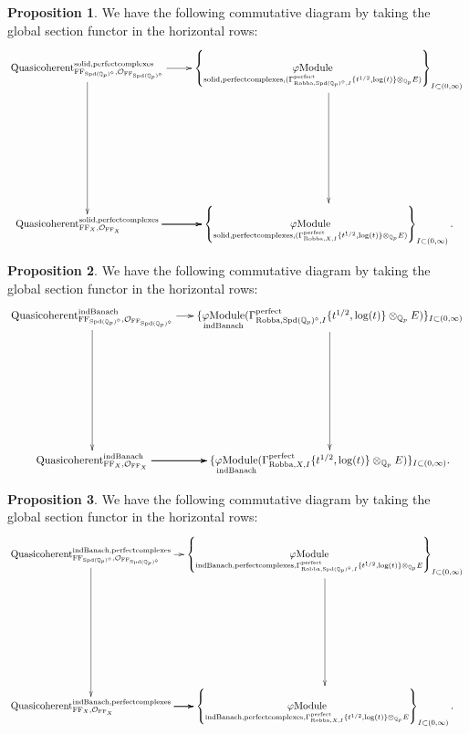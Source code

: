 \documentclass[12pt]{book}
\theoremstyle{definition}
\newtheorem{proposition}{Proposition}
\begin{document}
\begin{proposition}
We have the following commutative diagram by taking the global section functor in the horizontal rows:
\[\displayindent=+0in
\xymatrix@R+7pc{
\mathrm{Quasicoherent}^{\mathrm{solid,perfectcomplexes}}_{\mathrm{FF}_{\mathrm{Spd}(\mathbb{Q}_p)^\diamond},\mathcal{O}_{\mathrm{FF}_{\mathrm{Spd}(\mathbb{Q}_p)^\diamond}}} \ar[r] \ar[d] &\left\{\underset{\mathrm{solid,perfectcomplexes},(\Gamma^\text{perfect}_{\text{Robba},\mathrm{Spd}(\mathbb{Q}_p)^\diamond,I}\{t^{1/2},\log(t)\}\otimes_{\mathbb{Q}_p}E)}{\varphi\mathrm{Module}}\right\}_{I\subset (0,\infty)} \ar[d]  \\
\mathrm{Quasicoherent}^{\mathrm{solid,perfectcomplexes}}_{\mathrm{FF}_X,\mathcal{O}_{\mathrm{FF}_X}}  \ar[r] \ar[r] \ar[r] &\left\{\underset{\mathrm{solid,perfectcomplexes},(\Gamma^\text{perfect}_{\text{Robba},X,I}\{t^{1/2},\log(t)\}\otimes_{\mathbb{Q}_p}E)}{\varphi\mathrm{Module}}\right\}_{I\subset (0,\infty)}.   
}
\]
\end{proposition}

\begin{proposition}
We have the following commutative diagram by taking the global section functor in the horizontal rows:
\[\displayindent=+0in
\xymatrix@C-0.12in@R+7pc{
\mathrm{Quasicoherent}^{\mathrm{indBanach}}_{\mathrm{FF}_{\mathrm{Spd}(\mathbb{Q}_p)^\diamond},\mathcal{O}_{\mathrm{FF}_{\mathrm{Spd}(\mathbb{Q}_p)^\diamond}}} \ar[r] \ar[d] &\{\underset{\mathrm{indBanach}}{\varphi\mathrm{Module}}(\Gamma^\text{perfect}_{\text{Robba},\mathrm{Spd}(\mathbb{Q}_p)^\diamond,I}\{t^{1/2},\log(t)\}\otimes_{\mathbb{Q}_p}E)\}_{I\subset (0,\infty)}\ar[d]\\
\mathrm{Quasicoherent}^{\mathrm{indBanach}}_{\mathrm{FF}_X,\mathcal{O}_{\mathrm{FF}_X}}  \ar[r] \ar[r] \ar[r] &\{\underset{\mathrm{indBanach}}{\varphi\mathrm{Module}}(\Gamma^\text{perfect}_{\text{Robba},X,I}\{t^{1/2},\log(t)\}\otimes_{\mathbb{Q}_p}E)\}_{I\subset (0,\infty)}.    
}
\]
\end{proposition}

\begin{proposition}
We have the following commutative diagram by taking the global section functor in the horizontal rows:
\[\displayindent=+0in
\xymatrix@C-0.2in@R+7pc{
\mathrm{Quasicoherent}^{\mathrm{indBanach,perfectcomplexes}}_{\mathrm{FF}_{\mathrm{Spd}(\mathbb{Q}_p)^\diamond},\mathcal{O}_{\mathrm{FF}_{\mathrm{Spd}(\mathbb{Q}_p)^\diamond}}} \ar[d]\ar[r] &\left\{\underset{\mathrm{indBanach,perfectcomplexes},\Gamma^\text{perfect}_{\text{Robba},\mathrm{Spd}(\mathbb{Q}_p)^\diamond,I}\{t^{1/2},\log(t)\}\otimes_{\mathbb{Q}_p}E}{\varphi\mathrm{Module}}\right\}_{I\subset (0,\infty)}\ar[d]\\
\mathrm{Quasicoherent}^{\mathrm{indBanach,perfectcomplexes}}_{\mathrm{FF}_X,\mathcal{O}_{\mathrm{FF}_X}}  \ar[r] \ar[r] \ar[r] &\left\{\underset{\mathrm{indBanach,perfectcomplexes},\Gamma^\text{perfect}_{\text{Robba},X,I}\{t^{1/2},\log(t)\}\otimes_{\mathbb{Q}_p}E}{\varphi\mathrm{Module}}\right\}_{I\subset (0,\infty)}.    
}
\]

\end{proposition}
\end{document}
